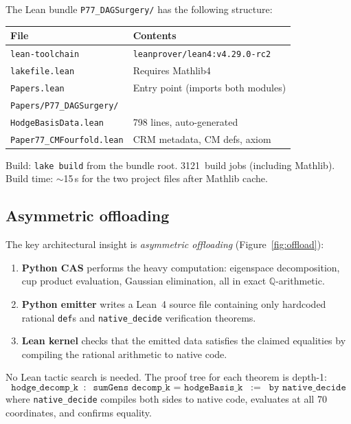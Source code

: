\documentclass[11pt]{article}
\theoremstyle{plain}
\theoremstyle{definition}
\theoremstyle{remark}
\newcommand{\Q}{\mathbb{Q}}
\begin{document}
The Lean bundle \texttt{P77\_DAGSurgery/} has the following
structure:
\begin{center}
\begin{tabular}{ll}
\toprule
\textbf{File} & \textbf{Contents} \\
\midrule
\texttt{lean-toolchain} & \texttt{leanprover/lean4:v4.29.0-rc2} \\
\texttt{lakefile.lean} & Requires Mathlib4 \\
\texttt{Papers.lean} & Entry point (imports both modules) \\
\texttt{Papers/P77\_DAGSurgery/} & \\
\quad\texttt{HodgeBasisData.lean} & 798 lines, auto-generated \\
\quad\texttt{Paper77\_CMFourfold.lean} & CRM metadata, CM defs, axiom \\
\bottomrule
\end{tabular}
\end{center}

\noindent
Build: \texttt{lake build} from the bundle root.
3121~build jobs (including Mathlib).  Build time: $\sim$15\,s
for the two project files after Mathlib cache.

\subsection{Asymmetric offloading}\label{sec:offload}

The key architectural insight is \emph{asymmetric offloading}
(Figure~\ref{fig:offload}):

\begin{enumerate}[nosep]
\item \textbf{Python CAS} performs the heavy computation:
  eigenspace decomposition, cup product evaluation, Gaussian
  elimination, all in exact $\Q$-arithmetic.
\item \textbf{Python emitter} writes a Lean~4 source file
  containing only hardcoded rational \texttt{def}s and
  \texttt{native\_decide} verification theorems.
\item \textbf{Lean kernel} checks that the emitted data satisfies
  the claimed equalities by compiling the rational arithmetic to
  native code.
\end{enumerate}

\noindent
No Lean tactic search is needed.  The proof tree for each
theorem is depth-1:
\[
  \texttt{hodge\_decomp\_k} \;\;:\;\;
  \texttt{sumGens decomp\_k = hodgeBasis\_k}
  \;\;:=\;\; \texttt{by native\_decide}
\]
where \texttt{native\_decide} compiles both sides to native code,
evaluates at all 70 coordinates, and confirms equality.
\end{document}

